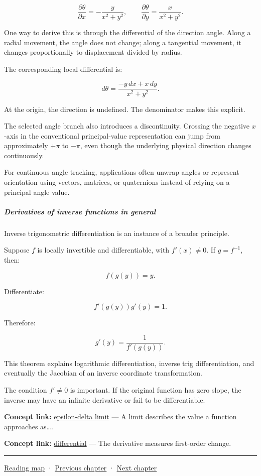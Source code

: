 \[
\boxed{ \frac{\partial\theta}{\partial x} =-\frac{y}{x^2+y^2}, \qquad \frac{\partial\theta}{\partial y} =\frac{x}{x^2+y^2} }.
\]

One way to derive this is through the differential of the direction angle. Along a radial movement, the angle does not change; along a tangential movement, it changes proportionally to displacement divided by radius.

The corresponding local differential is:

\[
d\theta=\frac{-y\,dx+x\,dy}{x^2+y^2}.
\]

At the origin, the direction is undefined. The denominator makes this explicit.

The selected angle branch also introduces a discontinuity. Crossing the negative \(x\)-axis in the conventional principal-value representation can jump from approximately \(+\pi\) to \(-\pi\), even though the underlying physical direction changes continuously.

For continuous angle tracking, applications often unwrap angles or represent orientation using vectors, matrices, or quaternions instead of relying on a principal angle value.

\subparagraph{Derivatives of inverse functions in general}\label{01-foundations-i-ch020-derivatives-of-inverse-functions-in-general}

\hypertarget{01-foundations-i-ch020-derivatives-of-inverse-functions-in-general}{}

Inverse trigonometric differentiation is an instance of a broader principle.

Suppose \(f\) is locally invertible and differentiable, with \(f'(x)\ne0\). If \(g=f^{-1}\), then:

\[
f(g(y))=y.
\]

Differentiate:

\[
f'(g(y))g'(y)=1.
\]

Therefore:

\[
\boxed{g'(y)=\frac1{f'(g(y))}}.
\]

This theorem explains logarithmic differentiation, inverse trig differentiation, and eventually the Jacobian of an inverse coordinate transformation.

The condition \(f'\ne0\) is important. If the original function has zero slope, the inverse may have an infinite derivative or fail to be differentiable.

\textbf{Concept link:} \hyperref[01-foundations-i-ch020-functions-limits-continuity-and-scalar-change]{epsilon-delta limit} --- A limit describes the value a function approaches as\ldots.

\textbf{Concept link:} \hyperref[01-foundations-i-ch020-functions-limits-continuity-and-scalar-change]{differential} --- The derivative measures first-order change.

\begin{center}\rule{0.5\linewidth}{0.5pt}\end{center}

\hyperref[volume-reading-map]{Reading map} · \hyperref[01-foundations-i-ch019-coordinate-frames-and-linear-systems]{Previous chapter} · \hyperref[02-foundations-ii-ch021-multivariable-derivatives-and-sensitivity]{Next chapter}
